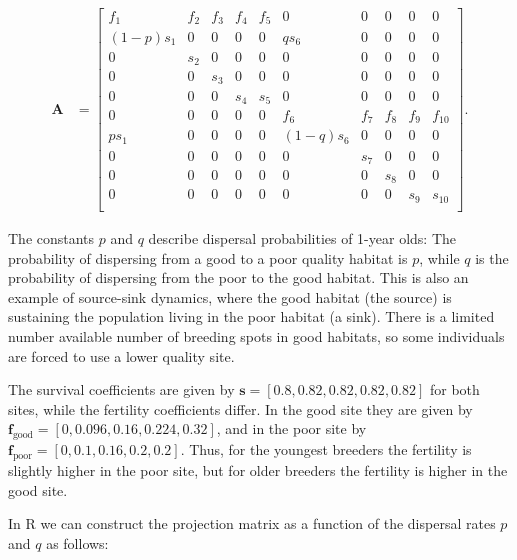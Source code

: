 \documentclass[
]{book}
\begin{document}
\begin{align}\label{AGulls}
\mathbf{A}
&=\left[\begin{array}{ccccc|ccccc}
f_1&f_2&f_3&f_4&f_5 &0&0&0&0&0 \\
(1-p)s_1&0&0&0&0&qs_6&0&0&0&0\\
0&s_2&0&0&0&0&0&0&0&0\\
0&0&s_3&0&0&0&0&0&0&0\\
0&0&0&s_4&s_5&0&0&0&0&0\\
\hline
0&0&0&0&0&f_6&f_7&f_8&f_9&f_{10}\\
ps_1&0&0&0&0&(1-q)s_6&0&0&0&0\\
0&0&0&0&0&0&s_7&0&0&0\\
0&0&0&0&0&0&0&s_8&0&0\\
0&0&0&0&0&0&0&0&s_9&s_{10}\\
\end{array}\right].
\end{align}

The constants \(p\) and \(q\) describe dispersal probabilities of 1-year olds: The probability of dispersing from a good to a poor quality habitat is \(p\), while \(q\) is the probability of dispersing from the poor to the good habitat. This is also an example of source-sink dynamics, where the good habitat (the source) is sustaining the population living in the poor habitat (a sink). There is a limited number available number of breeding spots in good habitats, so some individuals are forced to use a lower quality site.

The survival coefficients are given by \(\mathbf{s}=[0.8, 0.82, 0.82, 0.82, 0.82]\) for both sites, while the fertility coefficients differ. In the good site they are given by \(\mathbf{f}_\text{good}=[0, 0.096, 0.16, 0.224, 0.32]\), and in the poor site by \(\mathbf{f}_{\text{poor}}=[0, 0.1, 0.16, 0.2, 0.2]\). Thus, for the youngest breeders the fertility is slightly higher in the poor site, but for older breeders the fertility is higher in the good site.

In R we can construct the projection matrix as a function of the dispersal rates \(p\) and \(q\) as follows:
\end{document}
